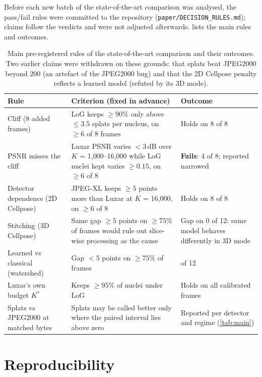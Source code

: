 Before each new batch of the state-of-the-art comparison was analysed, the pass/fail rules were
committed to the repository (\texttt{paper/DECISION\_RULES.md}); claims follow the verdicts and
were not adjusted afterwards.  lists the main rules and outcomes.

\begin{table}[!htb]
  \centering\small
  \begin{tabularx}{\linewidth}{@{}>{\raggedright\arraybackslash}p{3.3cm}>{\raggedright\arraybackslash}X>{\raggedright\arraybackslash}p{3.4cm}@{}}
    \toprule
    Rule & Criterion (fixed in advance) & Outcome \\
    \midrule
    Cliff (8 added frames) & LoG keeps $\ge90\%$ only above $\le3.5$ splats per nucleus, on $\ge6$ of 8 frames & Holds on 8 of 8 \\
    PSNR misses the cliff & Luxar PSNR varies $<3$\,dB over $K$ = 1{,}000--16{,}000 while LoG nuclei kept varies $\ge0.15$, on $\ge6$ of 8 & \textbf{Fails}: 4 of 8; reported narrowed \\
    Detector dependence (2D Cellpose) & JPEG-XL keeps $\ge5$ points more than Luxar at $K$ = 16{,}000, on $\ge6$ of 8 & Holds on 8 of 8 \\
    Stitching (3D Cellpose) & Same gap $\ge5$ points on $\ge75\%$ of frames would rule out slice-wise processing as the cause & Gap on 0 of 12: same model behaves differently in 3D mode \\
    Learned vs classical (watershed) & Gap $<5$ points on $\ge75\%$ of frames & 11 of 12 \\
    Luxar's own budget $K^\ast$ & Keeps $\ge95\%$ of nuclei under LoG & Holds on all calibrated frames \\
    Splats vs JPEG2000 at matched bytes & Splats may be called better only where the paired interval lies above zero & Reported per detector and regime (\cref{tab:main}) \\
    \bottomrule
  \end{tabularx}
  \caption{Main pre-registered rules of the state-of-the-art comparison and their outcomes.
  Two earlier claims were withdrawn on these grounds: that splats beat JPEG2000 beyond
  \SI{200}{\times} (an artefact of the JPEG2000 bug) and that the 2D Cellpose penalty reflects
  a learned model (refuted by its 3D mode).}
  \label{tab:rules}
\end{table}

\section{Reproducibility}\label{app:repro}

